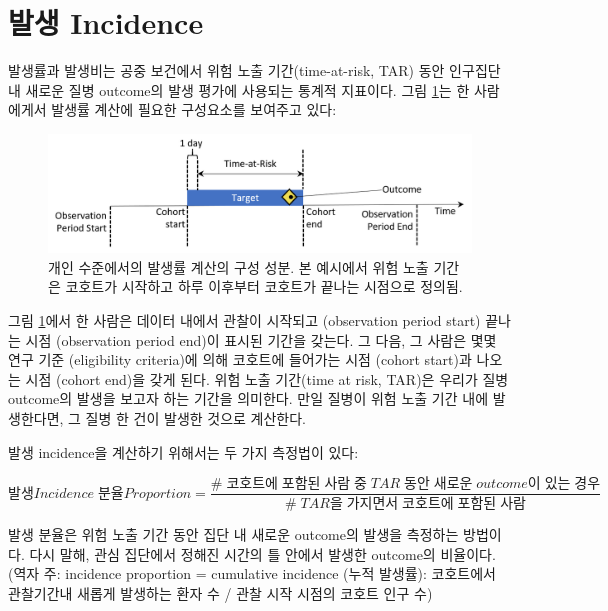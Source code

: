 \documentclass[11pt]{book}
\theoremstyle{definition}
\theoremstyle{definition}
\theoremstyle{definition}
\theoremstyle{remark}
\begin{document}
\section{발생 Incidence}\label{-incidence}

발생률과 발생비는 공중 보건에서 위험 노출 기간(time-at-risk, TAR) 동안
인구집단 내 새로운 질병 outcome의 발생 평가에 사용되는 통계적 지표이다.
그림 \ref{fig:incidenceTimeline}는 한 사람에게서 발생률 계산에 필요한
구성요소를 보여주고 있다: 

\begin{figure}

{\centering \includegraphics[width=1\linewidth]{images/Characterization/incidenceTimeline} 

}

\caption{개인 수준에서의 발생률 계산의 구성 성분. 본 예시에서 위험 노출 기간은 코호트가 시작하고 하루 이후부터 코호트가 끝나는 시점으로 정의됨.}\label{fig:incidenceTimeline}
\end{figure}

그림 \ref{fig:incidenceTimeline}에서 한 사람은 데이터 내에서 관찰이
시작되고 (observation period start) 끝나는 시점 (observation period
end)이 표시된 기간을 갖는다. 그 다음, 그 사람은 몇몇 연구 기준
(eligibility criteria)에 의해 코호트에 들어가는 시점 (cohort start)과
나오는 시점 (cohort end)을 갖게 된다. 위험 노출 기간(time at risk,
TAR)은 우리가 질병 outcome의 발생을 보고자 하는 기간을 의미한다. 만일
질병이 위험 노출 기간 내에 발생한다면, 그 질병 한 건이 발생한 것으로
계산한다.

발생 incidence을 계산하기 위해서는 두 가지 측정법이 있다:

\[ 
발생 Incidence\;분율 Proportion= \frac{\#\;코호트에\;포함된\;사람\;중\;TAR\;동안\;새로운\;outcome이\;있는\;경우}{\#\;TAR을\;가지면서\;코호트에\;포함된\;사람}
\]

발생 분율은 위험 노출 기간 동안 집단 내 새로운 outcome의 발생을 측정하는
방법이다. 다시 말해, 관심 집단에서 정해진 시간의 틀 안에서 발생한
outcome의 비율이다.  (역자 주: incidence
proportion = cumulative incidence (누적 발생률): 코호트에서 관찰기간내
새롭게 발생하는 환자 수 / 관찰 시작 시점의 코호트 인구 수)
\end{document}
